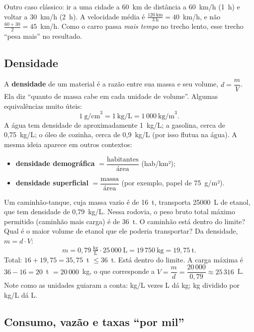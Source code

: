 Outro caso clássico: ir a uma cidade a 60~km de distância a 60~km/h (1~h) e
voltar a 30~km/h (2~h). A velocidade média é $\frac{120~\text{km}}{3~\text{h}} = 40$~km/h,
e não $\frac{60+30}{2} = 45$~km/h. Como o carro passa \emph{mais tempo} no
trecho lento, esse trecho ``pesa mais'' no resultado.

\subsection{Densidade}

A \textbf{densidade} de um material é a razão entre sua massa e seu volume,
$d = \dfrac{m}{V}$. Ela diz ``quanto de massa cabe em cada unidade de volume''.
Algumas equivalências muito úteis:
\[
  1~\text{g/cm}^3 = 1~\text{kg/L} = 1\,000~\text{kg/m}^3 .
\]
A água tem densidade de aproximadamente 1~kg/L; a gasolina, cerca de 0,75~kg/L;
o óleo de cozinha, cerca de 0,9~kg/L (por isso flutua na água). A mesma ideia
aparece em outros contextos:
\begin{itemize}[leftmargin=1.4em,itemsep=1pt]
  \item \textbf{densidade demográfica} $=\dfrac{\text{habitantes}}{\text{área}}$ (hab/km²);
  \item \textbf{densidade superficial} $=\dfrac{\text{massa}}{\text{área}}$ (por exemplo, papel de 75~g/m²).
\end{itemize}

\begin{exemplo}
Um caminhão-tanque, cuja massa vazio é de 16~t, transporta \num{25000}~L de
etanol, que tem densidade de 0,79~kg/L. Nessa rodovia, o peso bruto total
máximo permitido (caminhão mais carga) é de 36~t. O caminhão está dentro do
limite? Qual é o maior volume de etanol que ele poderia transportar?
\solucao
Da densidade, $m = d \cdot V$:
\[
  m = 0{,}79~\tfrac{\text{kg}}{\text{L}} \cdot 25\,000~\text{L} = 19\,750~\text{kg} = 19{,}75~\text{t}.
\]
Total: $16 + 19{,}75 = 35{,}75$~t $\leq 36$~t. Está dentro do limite.
A carga máxima é $36 - 16 = 20$~t $= 20\,000$~kg, o que corresponde a
$V = \dfrac{m}{d} = \dfrac{20\,000}{0{,}79} \approx 25\,316$~L.
Note como as unidades guiaram a conta: kg/L vezes L dá kg; kg dividido por
kg/L dá L.
\end{exemplo}

\subsection{Consumo, vazão e taxas ``por mil''}

